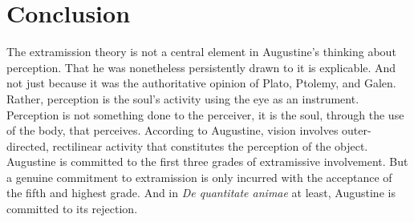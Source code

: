 \documentclass[12pt]{article}
\begin{document}


\section{Conclusion} %
\label{sec:conclusion}

The extramission theory is not a central element in Augustine’s thinking about perception. That he was nonetheless persistently drawn to it is explicable. And not just because it was the authoritative opinion of Plato, Ptolemy, and Galen. Rather, perception is the soul’s activity using the eye as an instrument. Perception is not something done to the perceiver, it is the soul, through the use of the body, that perceives. According to Augustine, vision involves outer-directed, rectilinear activity that constitutes the perception of the object. Augustine is committed to the first three grades of extramissive involvement. But a genuine commitment to extramission is only incurred with the acceptance of the fifth and highest grade. And in \emph{De quantitate animae} at least, Augustine is committed to its rejection.






\nocite{Tourscher:1933rw}
\nocite{Dodds:1963ul}
\nocite{Migne:1845aa}
\nocite{Migne:1856aa}
\nocite{Lacy:1980mk}
\nocite{Castellote:1978qe}
\nocite{Sorabji:1997ly}



\end{document}
